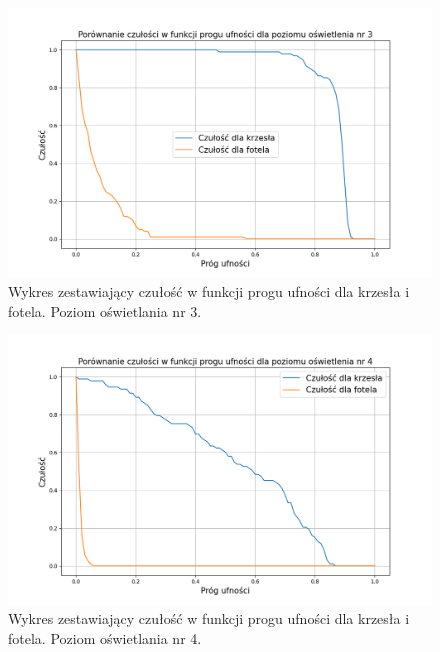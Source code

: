\begin{figure}[H]
    \centering
    \includegraphics[width=\linewidth]{r_test_dokładności/chair_charts/3.png}
    \caption{Wykres zestawiający czułość w funkcji progu ufności dla krzesła i fotela. Poziom oświetlania nr 3.}
    \label{fig:chair-game-3}
\end{figure}

\begin{figure}[H]
    \centering
    \includegraphics[width=\linewidth]{r_test_dokładności/chair_charts/4.png}
    \caption{Wykres zestawiający czułość w funkcji progu ufności dla krzesła i fotela. Poziom oświetlania nr 4.}
    \label{fig:chair-game-4}
\end{figure}


